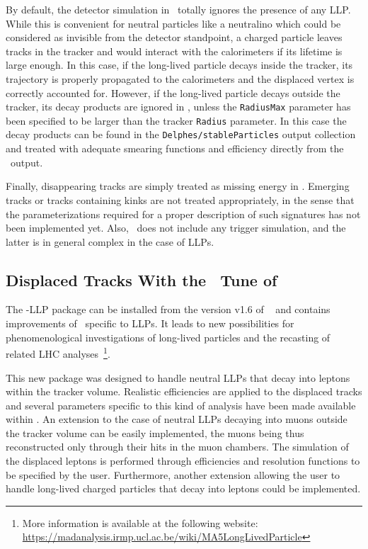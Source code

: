 By default, the detector simulation in \DEL\ totally ignores the presence of any
LLP. While this is convenient for neutral particles like a
neutralino which could be considered as invisible from the detector standpoint,
a charged particle leaves tracks in the tracker and would interact with the
calorimeters if its lifetime is large enough.
In this case, if the long-lived particle decays inside the tracker, its
trajectory is properly propagated to the calorimeters and the displaced vertex
is correctly accounted for. However, if the long-lived particle decays outside
the tracker, its decay products are ignored in \DEL, unless the \verb+RadiusMax+
parameter has been specified to be larger than the tracker \verb+Radius+
parameter. In this case the decay products can be found in the
\verb+Delphes/stableParticles+ output collection and
treated with adequate smearing functions and efficiency directly from the \DEL\
output.

Finally, disappearing tracks are simply treated as missing energy in \DEL. Emerging tracks or tracks containing kinks are not treated appropriately, in the sense that the parameterizations required for a proper description of such signatures has not been implemented yet. Also, \DEL\ does not include any trigger simulation, and the latter is in general complex in the case of LLPs.

\subsection{Displaced Tracks With the \MA\ Tune of \DEL}

The \DEL-LLP package can be installed from the version v1.6 of
\MA~\cite{Conte:2012fm,Conte:2014zja} and contains improvements of \DEL\
specific to LLPs. It leads to new possibilities for phenomenological investigations of long-lived
particles and the recasting of related LHC analyses~\footnote{More information is
available at the following website:\\ \noindent \url{https://madanalysis.irmp.ucl.ac.be/wiki/MA5LongLivedParticle}}.

This new package was designed to handle neutral LLPs that decay
into leptons within the tracker volume. Realistic efficiencies are applied to
the displaced tracks and several parameters specific to this kind of analysis
have been made available within \MA. An extension to the case of neutral
LLPs decaying into muons outside the tracker volume can be easily
implemented, the muons being thus reconstructed only through their hits in the
muon chambers. The simulation of the displaced leptons is performed through efficiencies and resolution functions to be specified by the user. Furthermore, another
extension allowing the user to handle long-lived charged particles that decay into
leptons could be implemented.

